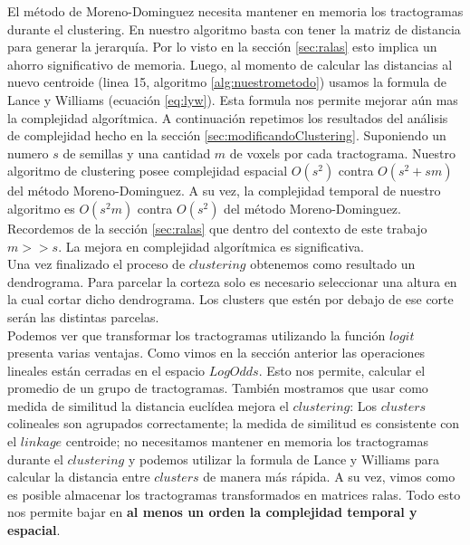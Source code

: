 El m\'etodo de Moreno-Dominguez necesita mantener en memoria los
tractogramas durante el clustering. En nuestro algoritmo basta con tener
la matriz de distancia para generar la jerarqu\'ia. Por lo visto en la
secci\'on \ref{sec:ralas} esto implica un ahorro significativo de memoria.
Luego, al momento de calcular las distancias al nuevo centroide 
(linea 15, algoritmo \ref{alg:nuestrometodo}) usamos la formula de Lance y
Williams (ecuaci\'on \ref{eq:lyw}). Esta formula nos permite mejorar a\'un 
mas la complejidad algor\'itmica. A continuaci\'on repetimos los resultados
del an\'alisis de complejidad hecho en la secci\'on 
\ref{sec:modificandoClustering}. 
Suponiendo un numero $s$ de semillas y una cantidad $m$ de voxels por cada
tractograma. Nuestro algoritmo de clustering posee complejidad espacial 
$O(s^2)$ contra $O(s^2 + sm)$ del m\'etodo Moreno-Dominguez. A su vez, la
complejidad temporal de nuestro algoritmo es $O(s^2m)$ contra $O(s^2)$ del
m\'etodo Moreno-Dominguez. Recordemos de la secci\'on \ref{sec:ralas} que
dentro del contexto de este trabajo $m >> s$. La mejora en complejidad 
algor\'itmica es significativa. \\

Una vez finalizado el proceso de $clustering$ obtenemos como resultado un 
dendrograma. Para parcelar la corteza solo es necesario seleccionar una
altura en la cual cortar dicho dendrograma. Los clusters que est\'en por
debajo de ese corte ser\'an las distintas parcelas. \\

Podemos ver que transformar los tractogramas utilizando la funci\'on 
$logit$ presenta varias ventajas. Como vimos en la secci\'on anterior las
operaciones lineales est\'an cerradas en el espacio $LogOdds$. Esto nos 
permite, calcular el promedio de un grupo de tractogramas. Tambi\'en
mostramos que usar como medida de similitud la distancia eucl\'idea mejora
el $clustering$: Los $clusters$ colineales son agrupados correctamente;
la medida de similitud es consistente con el $linkage$ centroide;
no necesitamos mantener en memoria los tractogramas durante el
$clustering$ y podemos utilizar la formula de Lance y Williams para
calcular la distancia entre $clusters$ de manera m\'as r\'apida.
A su vez, vimos como es posible almacenar los tractogramas transformados
en matrices ralas. Todo esto nos permite bajar en \textbf{al menos un
orden la complejidad temporal y espacial}.  \\
